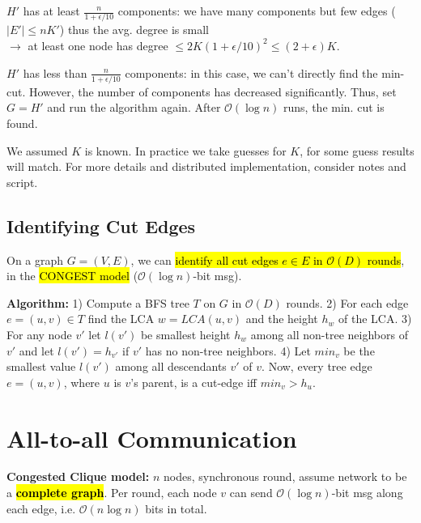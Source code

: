 \documentclass[a4paper, 8pt, landscape]{scrartcl}
\begin{document}
\begin{multicols*}{3}
\vspace*{-1mm}
\begin{compactenum}
\item $H'$ has at least $\frac{n}{1 + \epsilon/10}$ components: we have many components but few edges ($|E'| \leq nK'$) thus the avg. degree is small\\ $\rightarrow$ at least one node has degree $\leq 2K(1 + \epsilon/10)^2 \leq (2+\epsilon)K$.
\vspace*{1mm}
\item $H'$ has less than $\frac{n}{1 + \epsilon/10}$ components: in this case, we can't directly find the min-cut. However, the number of components has decreased significantly. Thus, set $G = H'$ and run the algorithm again. After $\mathcal{O}(\log n)$ runs, the min. cut is found.
\end{compactenum}

We assumed $K$ is known. In practice we take guesses for $K$, for some guess results will match. For more details and distributed implementation, consider notes and script.

\subsection{Identifying Cut Edges}

On a graph $G = (V,E)$, we can \hl{identify all cut edges $e \in E$ in $\mathcal{O}(D)$ rounds}, in the \hl{CONGEST model} ($\mathcal{O}(\log n)$-bit msg).

\textbf{Algorithm:} 1) Compute a BFS tree $T$ on $G$ in $\mathcal{O}(D)$ rounds. 2) For each edge $e = (u,v) \in T$ find the LCA $w = LCA(u,v)$ and the height $h_w$ of the LCA. 3) For any node $v'$ let $l(v')$ be smallest height $h_w$ among all non-tree neighbors of $v'$ and let $l(v') = h_{v'}$ if $v'$ has no non-tree neighbors. 4) Let $min_v$ be the smallest value $l(v')$ among all descendants $v'$ of $v$. Now, every tree edge $e = (u,v)$, where $u$ is $v$'s parent, is a cut-edge iff $min_v > h_u$.


\section{All-to-all Communication}

\textbf{Congested Clique model:} $n$ nodes, synchronous round, assume network to be a \hl{\textbf{complete graph}}. Per round, each node $v$ can send $\mathcal{O}(\log n)$-bit msg along each edge, i.e. $\mathcal{O}(n \log n)$ bits in total.


\end{multicols*}
\end{document}
